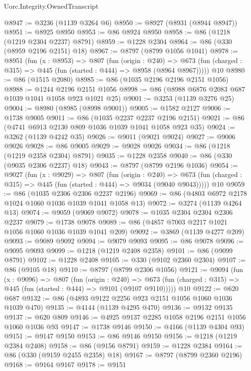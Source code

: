 \begin{lexlean}{Uorc.Integrity.OwnedTranscript}
\begin{coremodule}
@8947 := @3236 (@1139 @3264 @6)
@8950 := @8927 (@8931 (@8944 @8947))
@8951 := @8925 @8950
@8953 := @86 @8924 @8950
@8958 := @86 (@1218 (@1219 @2304 @2237) @8791)
@8959 := @1228 @2304
@8964 := @86 (@330 (@8959 @2196 @2151) @18)
@8967 := @8797 (@8799 @1056 @1041)
@8978 := @8951
    (fun (x : @8953) =>
    @807
      (fun (origin : @240) =>
      @673 (fun (charged : @315) => @445 (fun (started : @444) => @8958 (@8964 @8967)))))
    @10
@8980 := @86 (@1515 @2080)
@8985 := @86 (@1035 @2196 @2196 @2151 @1056)
@8988 := @1244 @2196 @2151 @1056
@8998 := @86 (@8988 @6876 @2083 @687 @1039 @1041 @1058 @923 @1021 @25)
@9001 := @3253 (@1139 @3276 @25)
@9004 := @8980 (@8985 (@8998 @9001))
@9005 := @1582 @2127
@9006 := @1738 @9005
@9011 := @86 (@1035 @2237 @2237 @2196 @2151)
@9021 := @86 (@4741 @6913 @2130 @809 @1036 @1039 @1041 @1058 @923 @35)
@9024 := @3262 (@1139 @4242 @35)
@9026 := @9011 (@9021 @9024)
@9027 := @9006 @9026
@9028 := @86 @9005
@9029 := @9028 @9026
@9034 := @86 (@1218 (@1219 @2358 @2304) @8791)
@9035 := @1228 @2358
@9040 := @86 (@330 (@9035 @2306 @2237) @18)
@9043 := @8797 (@8799 @2196 @1036)
@9054 := @9027
    (fun (x : @9029) =>
    @807
      (fun (origin : @240) =>
      @673 (fun (charged : @315) => @445 (fun (started : @444) => @9034 (@9040 @9043)))))
    @10
@9059 := @86 (@1035 @2306 @2306 @2237 @2196)
@9069 := @86 (@4803 @6972 @2178 @1024 @1060 @1036 @1039 @1041 @1058 @13)
@9072 := @3274 (@1139 @4264 @13)
@9074 := @9059 (@9069 @9072)
@9078 := @1035 @2304 @2304 @2306 @2237
@9079 := @1738 @9078
@9089 := @86 (@4857 @7003 @2217 @1021 @1056 @1060 @1036 @1039 @1041 @209)
@9092 := @3869 (@1139 @4277 @209)
@9093 := @9089 @9092
@9094 := @9079 @9093
@9095 := @86 @9078
@9096 := @9095 @9093
@9099 := @1218 (@1219 @2408 @2358)
@9101 := @86 (@9099 @8791)
@9102 := @1228 @2408
@9105 := @330 (@9102 @2360 @2304)
@9107 := @86 (@9105 @18)
@9110 := @8797 (@8799 @2306 @1056)
@9121 := @9094
    (fun (x : @9096) =>
    @807
      (fun (origin : @240) =>
      @673 (fun (charged : @315) => @445 (fun (started : @444) => @9101 (@9107 @9110)))))
    @10
@9122 := @620 @687
@9132 := @86 (@4893 @9122 @2256 @923 @2151 @1056 @1060 @1036 @1039 @470)
@9135 := @4144 (@1139 @4295 @470)
@9136 := @9132 @9135
@9137 := @620 @809
@9146 := @4925 @9137 @2285 @1058 @2196 @2151 @1056 @1060 @1036 @93
@9147 := @1738 @9146
@9150 := @4166 (@1139 @4304 @93)
@9151 := @9147 @9150
@9153 := @86 @9146 @9150
@9156 := @1218 (@1219 @2384 @2408)
@9158 := @86 (@9156 @8791)
@9159 := @1228 @2384
@9164 := @86 (@330 (@9159 @2455 @2358) @18)
@9167 := @8797 (@8799 @2360 @2196)
@9168 := @9164 @9167
@9178 := @9151

\end{coremodule}
\end{lexlean}
